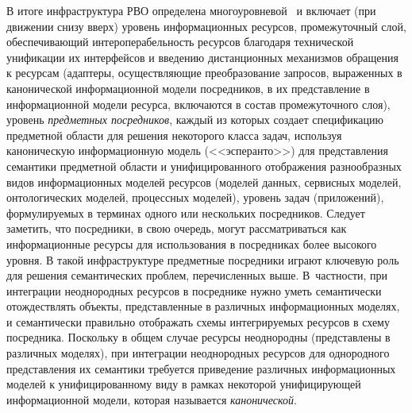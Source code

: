 \begin{multicols}{2}
     В итоге инфраструктура РВО определена многоуровневой~\cite{Briu05} и
включает (при движении снизу вверх) уровень информационных ресурсов,
проме\-жу\-точ\-ный слой, обеспечивающий интероперабельность ресурсов благодаря
технической унификации их интерфейсов и введению дистанционных механизмов
обращения к ресурсам (адаптеры, осуществляющие преобразование запросов,
выраженных в канонической информационной модели посред\-ни\-ков, в их представление в
информационной моде\-ли ресурса, включаются в состав промежуточного слоя), уровень
\textit{предметных посредников}, каж\-дый из которых создает спецификацию предметной
области для решения некоторого класса задач, используя каноническую информационную
модель (<<эсперанто>>) для представления семантики предметной области и
унифицированного отоб\-ра\-же\-ния разнообразных видов информационных моделей
ресурсов (моделей данных, сервисных мо\-де\-лей, онтологических моделей, процессных
моде\-лей), уровень задач (приложений), формулируемых в терминах одного или
нескольких посредников. Следует заметить, что посредники, в свою очередь, могут
рассматриваться как информационные ресурсы для использования в посредниках более
высокого уровня.
     В такой инфраструктуре предметные посредники играют ключевую роль для
решения семантических проблем, перечисленных выше. В~частности, при интеграции
неоднородных ресурсов в посреднике нужно уметь семантически отож\-де\-ст\-влять объекты,
представленные в различных информационных моделях, и семантически правильно
отображать схемы интегрируемых ресурсов в схему посредника. Поскольку в общем
случае ресурсы неоднородны (представлены в различных моделях), при интеграции
неоднородных ресурсов для однородного представления их семантики требуется
приведение различных информационных моделей к унифицированному виду в рамках
некоторой унифицирующей информационной модели, которая называется
\textit{канонической}.


\end{multicols}
